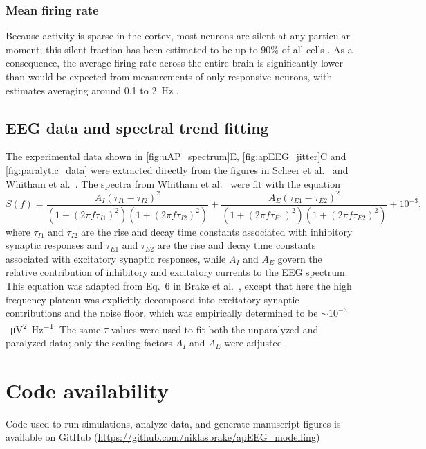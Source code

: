 \subsubsection{Mean firing rate}
Because activity is sparse in the cortex, most neurons are silent at any particular moment; this silent fraction has been estimated to be up to 90\% of all cells \cite{Shoham2006}. As a consequence, the average firing rate across the entire brain is significantly lower than would be expected from measurements of only responsive neurons, with estimates averaging around 0.1 to 2~\unit{\hertz} \cite{Kerr2005, Shoham2006, Barth2012}.

\subsection{EEG data and spectral trend fitting}
The experimental data shown in \autoref{fig:uAP_spectrum}E, {\ref{fig:apEEG_jitter}C} and {\ref{fig:paralytic_data}} were extracted directly from the figures in Scheer et al.~\cite{Scheer2006} and Whitham et al.~\cite{Whitham2007}. The spectra from Whitham et al.~\cite{Whitham2007} were fit with the equation
\begin{equation} \label{eq:syn_timescales}
S(f) = \frac{A_I(\tau_{I1}-\tau_{I2})^2}{(1+(2\pi f\tau_{I1})^2)(1+(2\pi f\tau_{I2})^2)}+\frac{A_E(\tau_{E1}-\tau_{E2})^2}{(1+(2\pi f\tau_{E1})^2)(1+(2\pi f\tau_{E2})^2)}+10^{-3}\mathrm{,}
\end{equation}
where $\tau_{I1}$ and $\tau_{I2}$ are the rise and decay time constants associated with inhibitory synaptic responses and $\tau_{E1}$ and $\tau_{E2}$ are the rise and decay time constants associated with excitatory synaptic responses, while $A_I$ and $A_E$ govern the relative contribution of inhibitory and excitatory currents to the EEG spectrum. This equation was adapted from Eq.~6 in Brake et al.~\cite{Brake2024}, except that here the high frequency plateau was explicitly decomposed into excitatory synaptic contributions and the noise floor, which was empirically determined to be ${\sim}10^{-3}$~\unit{{\micro\volt^2\hertz^{-1}}}. The same $\tau$ values were used to fit both the unparalyzed and paralyzed data; only the scaling factors $A_I$ and $A_E$ were adjusted. 

\section{Code availability}
Code used to run simulations, analyze data, and generate manuscript figures is available on GitHub (\url{https://github.com/niklasbrake/apEEG_modelling})

